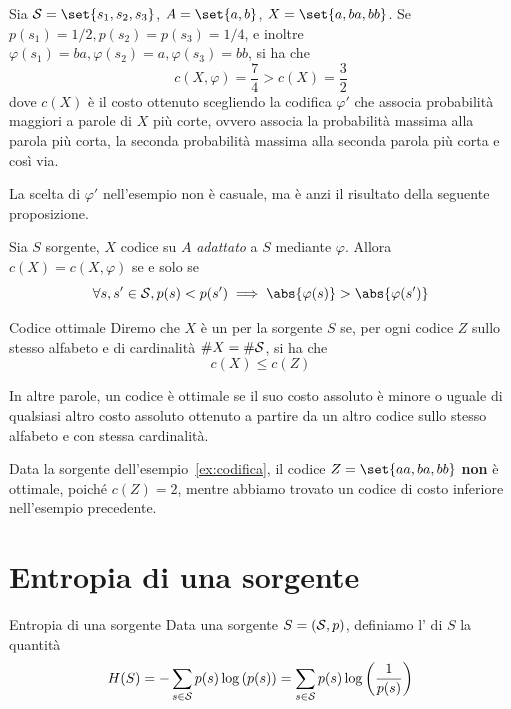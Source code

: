 \begin{example}[label=ex:codifica]{}
  Sia \(\SCal = \set{s_1,s_2,s_3}\), \(A = \set{a,b}\), \(X = \set{a,ba,bb}\).
  Se \(p(s_1) = 1/2, p(s_2) = p(s_3) = 1/4\), e inoltre \(\varphi(s_1) = ba, \varphi(s_2) = a, \varphi(s_3) = bb\), si ha che
    \[c(X,\varphi) = \frac{7}{4} > c(X) = \frac{3}{2}\]
  dove $c(X)$ è il costo ottenuto scegliendo la codifica $\varphi'$ che associa probabilità maggiori a parole di $X$ più corte, ovvero associa la probabilità massima alla parola più corta, la seconda probabilità massima alla seconda parola più corta e così via. 
\end{example}

La scelta di $\varphi'$ nell'esempio non è casuale, ma è anzi il risultato della seguente proposizione.

\begin{proposition}{}
  Sia \(S\) sorgente, \(X\) codice su \(A\) \emph{adattato} a \(S\) mediante \(\varphi\).
  Allora \(c(X) = c(X,\varphi)\) se e solo se
    \[\forall s,s' \in \SCal, p(s) < p(s') \implies \abs{\varphi(s)} > \abs{\varphi(s')} \]
\end{proposition}

\begin{definition}{Codice ottimale}
  Diremo che \(X\) è un  per la sorgente \(S\) se, per ogni codice \(Z\) sullo stesso alfabeto e di cardinalità \(\#X=\#\mathcal{S}\), si ha che
  \[c(X) \leq c(Z)\]
\end{definition}

In altre parole, un codice è ottimale se il suo costo assoluto è minore o uguale di qualsiasi altro costo assoluto ottenuto a partire da un altro codice sullo stesso alfabeto e con stessa cardinalità.

\begin{example}{}
  Data la sorgente dell'esempio~\ref{ex:codifica}, il codice \(Z = \set{aa,ba,bb}\) \textbf{non} è ottimale, poiché \(c(Z) = 2\), mentre abbiamo trovato un codice di costo inferiore nell'esempio precedente.
\end{example}

\section{Entropia di una sorgente}

\begin{definition}{Entropia di una sorgente}
  Data una sorgente \(S = (\mathcal{S},p)\), definiamo l' di \(S\) la quantità
  \[H(S) = -\sum_{s \in \mathcal{S}} p(s) \log\left(p(s)\right) = \sum_{s \in \mathcal{S}} p(s) \log\left(\frac{1}{p(s)}\right)\]  
\end{definition}

